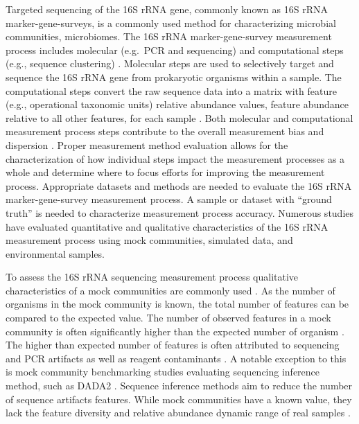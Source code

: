 \documentclass{bmcart}
\begin{document}
Targeted sequencing of the 16S rRNA gene, commonly known as 16S rRNA
marker-gene-surveys, is a commonly used method for characterizing
microbial communities, microbiomes. The 16S rRNA marker-gene-survey
measurement process includes molecular (e.g.~PCR and sequencing) and
computational steps (e.g., sequence clustering) \cite{Goodrich2014}.
Molecular steps are used to selectively target and sequence the 16S rRNA
gene from prokaryotic organisms within a sample. The computational steps
convert the raw sequence data into a matrix with feature (e.g.,
operational taxonomic units) relative abundance values, feature
abundance relative to all other features, for each sample
\cite{Goodrich2014}. Both molecular and computational measurement
process steps contribute to the overall measurement bias and dispersion
\cite{Amore2016,Goodrich2014,brooks2015truth}. Proper measurement
method evaluation allows for the characterization of how individual
steps impact the measurement processes as a whole and determine where to
focus efforts for improving the measurement process. Appropriate
datasets and methods are needed to evaluate the 16S rRNA
marker-gene-survey measurement process. A sample or dataset with
``ground truth'' is needed to characterize measurement process accuracy.
Numerous studies have evaluated quantitative and qualitative
characteristics of the 16S rRNA measurement process using mock
communities, simulated data, and environmental samples.

To assess the 16S rRNA sequencing measurement process qualitative
characteristics of a mock communities are commonly used
\cite{bokulich2016mockrobiota}. As the number of organisms in the
mock community is known, the total number of features can be compared to
the expected value. The number of observed features in a mock community
is often significantly higher than the expected number of organism
\cite{Kopylova2014}. The higher than expected number of features is
often attributed to sequencing and PCR artifacts as well as reagent
contaminants \cite{brooks2015truth,Huse2010}. A notable exception
to this is mock community benchmarking studies evaluating sequencing
inference method, such as DADA2 \cite{callahan2016dada2}. Sequence
inference methods aim to reduce the number of sequence artifacts
features. While mock communities have a known value, they lack the
feature diversity and relative abundance dynamic range of real samples
\cite{bokulich2016mockrobiota}.
\end{document}
